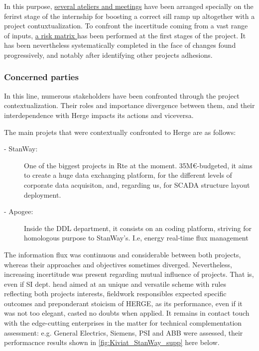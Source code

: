 In this purpose, \hyperref[subsub:introduction:thesis-purpose:project-approach:parties]{several ateliers and meetings} have been arranged specially on the ferirst stage of the internship for boosting a correct sill ramp up altogether with a project contuxtualization.  To confront the incertitude coming from a vast range of inputs, \hyperref[subsub:introduction:thesis-purpose:risk-assessement]{a risk matrix }has been performed at the first stages of the project. It has been nevertheless systematically completed in the face of changes found progressively, and notably after identifying other projects adhesions.


\subsubsection{Concerned parties}
\label{subsub:introduction:thesis-purpose:project-approach:parties}

In this line, numerous stakeholders have been confronted through the project contextualization. Their roles and importance divergence between them, and their interdependence with Herge impacts its actions and viceversa.

The main projets that were contextually confronted to Herge are as follows:
\begin{description}
    \item[- StanWay:]
    One of the biggest projects in Rte at the moment. 35M€-budgeted, it aims to create a huge data exchanging platform, for the different levels of corporate data acquisiton, and, regarding us, for SCADA structure layout deployment.
    \item[- Apogee:]
    Inside the DDL department, it consists on an coding platform, striving for homologous purpose to StanWay's. I.e, energy real-time flux management
    
\end{description}

\label{sec:approach:project-approach:parties:stanway}

The information flux was continuous and considerable between both projects, whereas their approaches and objectives sometimes diverged. Nevertheless, increasing incertitude was present regarding mutual influence of projects. That is, even if SI dept. head aimed at an unique and versatile scheme with rules reflecting both projects interests, fieldwork responsibles expected specific outcomes and preponderant stoicism of HERGE, as its performance, even if it was not too elegant, casted no doubts when applied. It remains in contact touch with the edge-cutting enterprises in the matter for technical complementation assessment: e.g. General Electrics, Siemens, PSI and ABB were assessed, their performacnce results shown in \autoref{fig:Kiviat_StanWay_supp} here below. 

